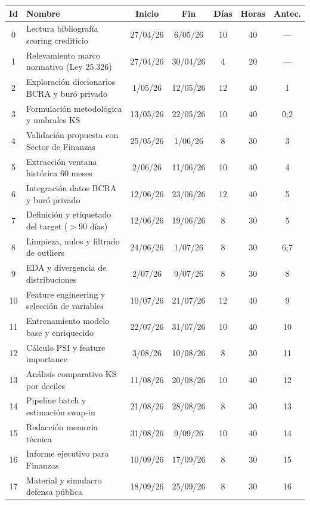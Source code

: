 \documentclass[
11pt, %
]{charter}
\begin{document}
\begin{center}
\vspace{0.2cm}
\scriptsize
\setlength{\tabcolsep}{4pt}
\begin{tabular}{|c|p{6.5cm}|c|c|c|c|c|}
\hline
\rowcolor[HTML]{C0C0C0}
\textbf{Id} & \textbf{Nombre} & \textbf{Inicio} & \textbf{Fin} & \textbf{D\'ias} & \textbf{Horas} & \textbf{Antec.} \\ \hline
0  & Lectura bibliograf\'{i}a scoring crediticio          & 27/04/26 & 6/05/26  & 10 & 40 & ---  \\ \hline
1  & Relevamiento marco normativo (Ley 25.326)            & 27/04/26 & 30/04/26 & 4  & 20 & ---  \\ \hline
2  & Exploraci\'{o}n diccionarios BCRA y bur\'{o} privado & 1/05/26  & 12/05/26 & 12 & 40 & 1    \\ \hline
3  & Formulaci\'{o}n metodol\'{o}gica y umbrales KS       & 13/05/26 & 22/05/26 & 10 & 40 & 0;2  \\ \hline
4  & Validaci\'{o}n propuesta con Sector de Finanzas      & 25/05/26 & 1/06/26  & 8  & 30 & 3    \\ \hline
5  & Extracci\'{o}n ventana hist\'{o}rica 60 meses        & 2/06/26  & 11/06/26 & 10 & 40 & 4    \\ \hline
6  & Integraci\'{o}n datos BCRA y bur\'{o} privado        & 12/06/26 & 23/06/26 & 12 & 40 & 5    \\ \hline
7  & Definici\'{o}n y etiquetado del target ($>$90 d\'{i}as) & 12/06/26 & 19/06/26 & 8 & 30 & 5 \\ \hline
8  & Limpieza, nulos y filtrado de outliers               & 24/06/26 & 1/07/26  & 8  & 30 & 6;7  \\ \hline
9  & EDA y divergencia de distribuciones                  & 2/07/26  & 9/07/26  & 8  & 30 & 8    \\ \hline
10 & Feature engineering y selecci\'{o}n de variables     & 10/07/26 & 21/07/26 & 12 & 40 & 9    \\ \hline
11 & Entrenamiento modelo base y enriquecido              & 22/07/26 & 31/07/26 & 10 & 40 & 10   \\ \hline
12 & C\'{a}lculo PSI y feature importance                 & 3/08/26  & 10/08/26 & 8  & 30 & 11   \\ \hline
13 & An\'{a}lisis comparativo KS por deciles              & 11/08/26 & 20/08/26 & 10 & 40 & 12   \\ \hline
14 & Pipeline batch y estimaci\'{o}n swap-in              & 21/08/26 & 28/08/26 & 8  & 30 & 13   \\ \hline
15 & Redacci\'{o}n memoria t\'{e}cnica                    & 31/08/26 & 9/09/26  & 10 & 40 & 14   \\ \hline
16 & Informe ejecutivo para Finanzas                      & 10/09/26 & 17/09/26 & 8  & 30 & 15   \\ \hline
17 & Material y simulacro defensa p\'{u}blica             & 18/09/26 & 25/09/26 & 8  & 30 & 16   \\ \hline
\end{tabular}
\end{center}
\end{document}
